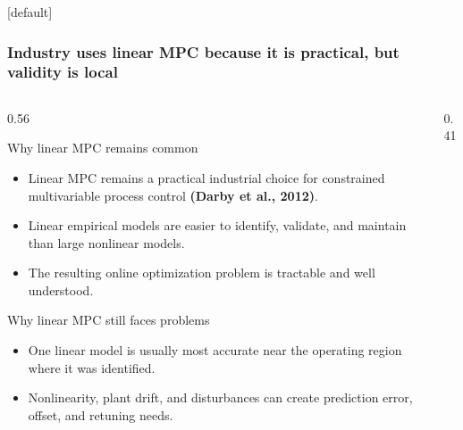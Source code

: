 \documentclass[aspectratio=169]{beamer}
\begin{document}
\begin{frame}
[default]
\frametitle{\large \textbf{Industry uses linear MPC because it is practical, but validity is local}}
\scriptsize

\vspace{-0.28cm}

\begin{columns}[T,onlytextwidth]
\begin{column}{0.56\textwidth}

\begin{block}{Why linear MPC remains common}
\begin{itemize}\justifying
  \setlength\itemsep{0.35ex}

  \item Linear MPC remains a practical industrial choice for constrained multivariable process control
  {\bf \color{maroon1} \scriptsize (Darby et al., 2012)}.

  \item Linear empirical models are easier to identify, validate, and maintain than large nonlinear models.

  \item The resulting online optimization problem is tractable and well understood.
\end{itemize}
\end{block}

\vspace{0.02cm}

\begin{block}{Why linear MPC still faces problems}
\begin{itemize}\justifying
  \setlength\itemsep{0.35ex}

  \item One linear model is usually most accurate near the operating region where it was identified.

  \item Nonlinearity, plant drift, and disturbances can create prediction error, offset, and retuning needs.
\end{itemize}
\end{block}

\end{column}

\begin{column}{0.41\textwidth}
\vspace{0.5cm}
\centering
{}
\end{column}
\end{columns}
\end{frame}
\end{document}
